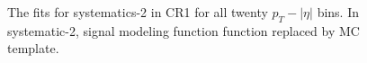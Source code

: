 \begin{figure}[H]
\begin{center}
\scalebox{0.35}{}\scalebox{0.35}{}
\scalebox{0.35}{}\scalebox{0.35}{}
\caption{The fits for systematics-2 in CR1 for all twenty $p_T-|\eta|$ bins. In systematic-2, signal modeling function function replaced by MC template.}
\label{fig:fit_cr2_sys2}
\end{center}
\end{figure}
